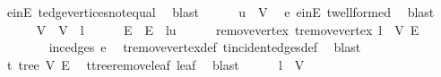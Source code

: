 \begin{isabellebody}
\ e{\isacharunderscore}{\kern0pt}in{\isacharunderscore}{\kern0pt}E\ t{\isachardot}{\kern0pt}edge{\isacharunderscore}{\kern0pt}vertices{\isacharunderscore}{\kern0pt}not{\isacharunderscore}{\kern0pt}equal\ \isamarkupfalse%
\ blast\isanewline
\ \ \ \ \isamarkupfalse%
\ {\isachardoublequoteopen}u\ {\isasymin}\ V{\isachardoublequoteclose}\ \isamarkupfalse%
\ e\ e{\isacharunderscore}{\kern0pt}in{\isacharunderscore}{\kern0pt}E\ t{\isachardot}{\kern0pt}wellformed\ \isamarkupfalse%
\ blast\isanewline
\ \ \ \ \isamarkupfalse%
\ {\isacharquery}{\kern0pt}V{\isacharprime}{\kern0pt}\ {\isacharequal}{\kern0pt}\ {\isachardoublequoteopen}V\ {\isacharminus}{\kern0pt}\ {\isacharbraceleft}{\kern0pt}l{\isacharbraceright}{\kern0pt}{\isachardoublequoteclose}\isanewline
\ \ \ \ \isamarkupfalse%
\ {\isacharquery}{\kern0pt}E{\isacharprime}{\kern0pt}\ {\isacharequal}{\kern0pt}\ {\isachardoublequoteopen}E\ {\isacharminus}{\kern0pt}\ {\isacharbraceleft}{\kern0pt}{\isacharbraceleft}{\kern0pt}l{\isacharcomma}{\kern0pt}u{\isacharbraceright}{\kern0pt}{\isacharbraceright}{\kern0pt}{\isachardoublequoteclose}\isanewline
\ \ \ \ \isamarkupfalse%
\ remove{\isacharunderscore}{\kern0pt}vertex{\isacharcolon}{\kern0pt}\ {\isachardoublequoteopen}t{\isachardot}{\kern0pt}remove{\isacharunderscore}{\kern0pt}vertex\ l\ {\isacharequal}{\kern0pt}\ {\isacharparenleft}{\kern0pt}{\isacharquery}{\kern0pt}V{\isacharprime}{\kern0pt}{\isacharcomma}{\kern0pt}\ {\isacharquery}{\kern0pt}E{\isacharprime}{\kern0pt}{\isacharparenright}{\kern0pt}{\isachardoublequoteclose}\isanewline
\ \ \ \ \ \ \isamarkupfalse%
\ inc{\isacharunderscore}{\kern0pt}edges\ e\ \isamarkupfalse%
\ t{\isachardot}{\kern0pt}remove{\isacharunderscore}{\kern0pt}vertex{\isacharunderscore}{\kern0pt}def\ t{\isachardot}{\kern0pt}incident{\isacharunderscore}{\kern0pt}edges{\isacharunderscore}{\kern0pt}def\ \isamarkupfalse%
\ blast\isanewline
\ \ \ \ \isamarkupfalse%
\ \isamarkupfalse%
\ t{\isacharprime}{\kern0pt}{\isacharcolon}{\kern0pt}\ {\isachardoublequoteopen}tree\ {\isacharquery}{\kern0pt}V{\isacharprime}{\kern0pt}\ {\isacharquery}{\kern0pt}E{\isacharprime}{\kern0pt}{\isachardoublequoteclose}\ \isamarkupfalse%
\ t{\isachardot}{\kern0pt}tree{\isacharunderscore}{\kern0pt}remove{\isacharunderscore}{\kern0pt}leaf\ leaf\ \isamarkupfalse%
\ blast\isanewline
\ \ \ \ \isamarkupfalse%
\ {\isachardoublequoteopen}l\ {\isasymin}\ V{\isachardoublequoteclose}\ \isamarkupfalse%

\end{isabellebody}
